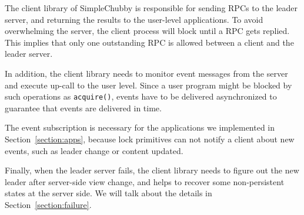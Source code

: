 The client library of SimpleChubby is responsible for sending RPCs to the
leader server, and returning the results to the user-level applications.
To avoid overwhelming the server, the client process will block until a RPC
gets replied. This implies that only one
outstanding RPC is allowed between a client and the leader server.

In addition, the client library needs to
monitor event messages from the server and execute up-call
to the user level.
Since a user program might be blocked by such operations
as \texttt{acquire()}, events have to be delivered asynchronized
to guarantee that events are delivered in time.

The event subscription is necessary
for the applications we implemented in Section~\ref{section:apps},
because lock primitives can not notify a client about new events,
such as leader change or content updated.

Finally, when the leader server fails, the client library needs to figure out
the new leader after server-side view change, and helps to recover some
non-persistent states at the server side. We will talk about the details in
Section~\ref{section:failure}.




